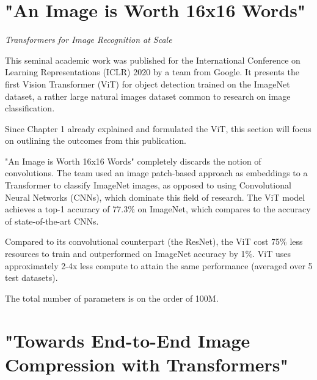 \section{"An Image is Worth 16x16 Words"}

\LARGE{\emph{Transformers for Image Recognition at Scale}}

This seminal academic work was published for the International Conference on 
Learning Representations (ICLR) 2020 by a team from Google.
It presents the first Vision Transformer (ViT) for object detection
trained on the ImageNet dataset, a rather large natural images dataset common to research on 
image classification.


Since Chapter 1 already explained and formulated the ViT, this section will focus
on outlining the outcomes from this publication.

"An Image is Worth 16x16 Words" completely discards the notion of convolutions. 
The team used an image patch-based approach as embeddings to a Transformer to classify ImageNet images, 
as opposed to using Convolutional Neural Networks (CNNs), which dominate this field of research.
The ViT model achieves a top-1 accuracy of 77.3\% on ImageNet, which 
compares to the accuracy of state-of-the-art CNNs.

Compared to its convolutional counterpart (the ResNet), the ViT cost 75\% 
less resources to train and outperformed on ImageNet accuracy by 1\%. 
ViT uses approximately 2-4x less compute to attain the same performance 
(averaged over 5 test datasets). 

The total number of parameters is on the order of 100M.







\newpage
\section{"Towards End-to-End Image Compression with Transformers"}


